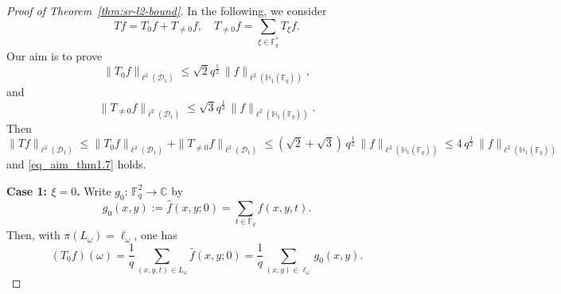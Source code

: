 \documentclass[11pt]{article}
\newcommand{\1}{\mathbf 1}
\newcommand{\Fq}{\mathbb{F}_q}
\begin{document}
\begin{proof}[Proof of Theorem~\ref{thm:sr-l2-bound}]
In the following, we consider 
\[
Tf=T_0 f+T_{\neq 0} f, \quad T_{\neq 0} f=\sum_{\xi\in\mathbb F_q^\ast }T_\xi f.
\]
Our aim is to prove 
\begin{equation} \label{eq_conclusion_T0}
\|T_0 f\|_{\ell^2(\mathcal D_1)}
\leq \sqrt{2} q^{\frac12}\,\|f\|_{\ell^2(\mathbb H_1(\mathbb F_q))},
\end{equation}
and 
\begin{equation} \label{eq_conclusion_Tnot0}
\|T_{\neq 0}f\|_{\ell^2(\mathcal D_1)}
\leq
\sqrt{3} q^{\frac{1}{2}}\,\|f\|_{\ell^2(\mathbb H_1(\mathbb F_q))}.
\end{equation}
Then 
\[
\|Tf\|_{\ell^2(\mathcal D_1)}
\le
\|T_0 f\|_{\ell^2(\mathcal D_1)}+\|T_{\neq 0}f\|_{\ell^2(\mathcal D_1)}
\leq (\sqrt{2}+\sqrt{3}) \,q^{\frac{1}{2}}\,\|f\|_{\ell^2(\mathbb H_1(\mathbb F_q))} \leq 4 \,q^{\frac{1}{2}}\,\|f\|_{\ell^2(\mathbb H_1(\mathbb F_q))}
\]
and \eqref{eq_aim_thm1.7} holds. 


\noindent\textbf{Case 1: $\xi=0$.} Write $g_0:\, \Fq^2\rightarrow \mathbb{C}$ by 
\begin{equation} \label{eq_def_g0}
g_0(x,y):=\widehat f(x,y;0)=\sum_{t\in\mathbb F_q} f(x,y,t).
\end{equation}
Then, with $\pi(L_{\omega})=\ell_\omega$, one has
\begin{equation} \label{eq_intog}
(T_0 f)(\omega)
=\frac1q\sum_{(x,y,t)\in L_\omega}\widehat f(x,y;0)
=\frac1q\sum_{(x,y)\in \ell_\omega} g_0(x,y).
\end{equation}


\end{proof}
\end{document}
